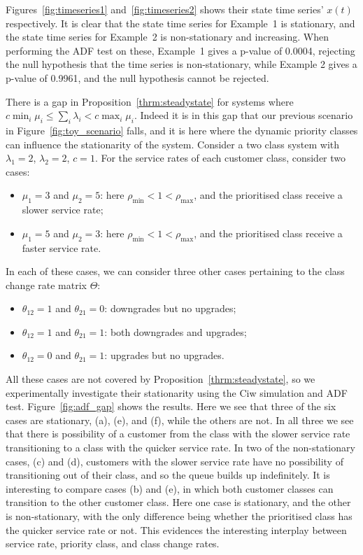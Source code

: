 \documentclass{article}
\begin{document}
Figures~\ref{fig:timeseries1} and~\ref{fig:timeseries2} shows their state time
series' $x(t)$ respectively. It is clear that the state time series for
Example~1 is stationary, and the state time series for Example~2 is
non-stationary and increasing. When performing the ADF test on these, Example~1
gives a p-value of 0.0004, rejecting the null hypothesis that the time series is
non-stationary, while Example 2 gives a p-value of 0.9961, and the null
hypothesis cannot be rejected.

There is a gap in Proposition~\ref{thrm:steadystate} for systems where
$c \min_i \mu_i \leq \sum_i \lambda_i < c \max_i \mu_i$. Indeed it is in this
gap that our previous scenario in Figure~\ref{fig:toy_scenario} falls, and it is
here where the dynamic priority classes can influence the stationarity of the
system. Consider a two class system with $\lambda_1 = 2$, $\lambda_2 = 2$,
$c = 1$. For the service rates of each customer class, consider two cases:

\begin{itemize}
  \item $\mu_1 = 3$ and $\mu_2 = 5$: here
  $\rho_{\text{min}} < 1 < \rho_{\text{max}}$, and the prioritised class receive
  a slower service rate;
  \item $\mu_1 = 5$ and $\mu_2 = 3$: here
  $\rho_{\text{min}} < 1 < \rho_{\text{max}}$, and the prioritised class receive
  a faster service rate.
\end{itemize}

In each of these cases, we can consider three other cases pertaining to the
class change rate matrix $\Theta$:

\begin{itemize}
  \item $\theta_{12} = 1$ and $\theta_{21} = 0$: downgrades but no upgrades;
  \item $\theta_{12} = 1$ and $\theta_{21} = 1$: both downgrades and upgrades;
  \item $\theta_{12} = 0$ and $\theta_{21} = 1$: upgrades but no upgrades.
\end{itemize}

All these cases are not covered by Proposition~\ref{thrm:steadystate}, so we
experimentally investigate their stationarity using the Ciw simulation and ADF
test. Figure~\ref{fig:adf_gap} shows the results. Here we see that three of the
six cases are stationary, (a), (e), and (f), while the others are not. In all
three we see that there is possibility of a customer from the class with the
slower service rate transitioning to a class with the quicker service rate. In
two of the non-stationary cases, (c) and (d), customers with the slower service
rate have no possibility of transitioning out of their class, and so the queue
builds up indefinitely.
It is interesting to compare cases (b) and (e), in which both customer classes
can transition to the other customer class. Here one case is stationary, and the
other is non-stationary, with the only difference being whether the prioritised
class has the quicker service rate or not. This evidences the interesting
interplay between service rate, priority class, and class change rates.
\end{document}
